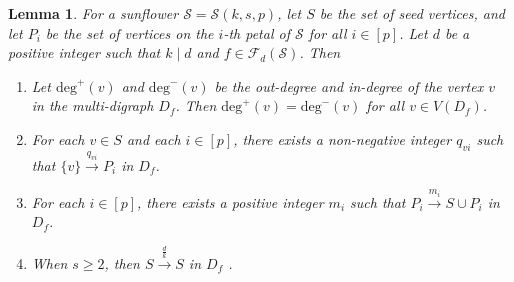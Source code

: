\documentclass{article}
\newtheorem{lem}[thm]{Lemma}
\begin{document}
\begin{lem}\label{yinli3.2}
For a sunflower $\mathcal{S}=\mathcal{S}(k,s,p)$,
let $S$ be the set of seed vertices, and let $P_{i}$ be the set of vertices on the $i$-th petal of $\mathcal{S}$ for all $i\in[p]$.
Let $d$ be a positive integer such that $k \mid d$ and $f \in \mathcal{F}_d(\mathcal{S})$.
Then

\begin{enumerate}
\renewcommand{\labelenumi}{(\alph{enumi})}
\item Let $\mathrm{deg}^+(v)$ and $\mathrm{deg}^-(v)$ be the out-degree and in-degree of the vertex $v$ in the multi-digraph $D_f$. Then $\mathrm{deg}^+(v) =\mathrm{deg}^-(v)$  for all $v \in V(D_f)$.

\item  For each $v \in S$ and each $i \in [p]$,  there exists a non-negative integer $q_{vi}$ such that $\{v\} \xrightarrow{q_{vi}}  P_{i}$ in $D_f$.

\item For each $i \in [p]$,  there exists a positive integer $m_i$ such that $P_{i} \xrightarrow{m_i} S \cup P_{i}$ in $D_f$.

\item When $s \geq 2$, then $S \xrightarrow{\frac{d}{k}} S$ in $D_f$ .


\end{enumerate}
\end{lem}
\end{document}
